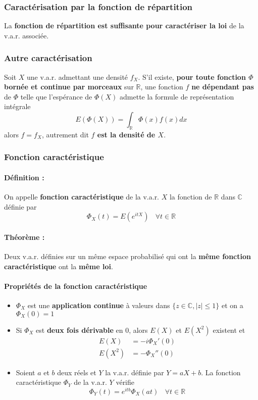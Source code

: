 \documentclass[10pt,a4paper,twoside]{article}
\begin{document}
\subsubsection{Caractérisation par la fonction de répartition}
La \textbf{fonction de répartition est suffisante pour caractériser la loi} de la v.a.r. associée.

\subsubsection{Autre caractérisation}
Soit $X$ une v.a.r. admettant une densité $f_{X}$. S'il existe, \textbf{pour toute fonction $\Phi$ bornée et continue par morceaux} sur $\mathbb{R}$, une fonction $f$ \textbf{ne dépendant pas} de $\Phi$ telle que l'espérance de $\Phi(X)$ admette la formule de représentation intégrale
$$E(\Phi(X))=\int_{\mathbb{R}} \Phi(x)f(x)dx$$
alors $f=f_{X}$, autrement dit \textbf{$f$ est la densité de $X$}.


\subsubsection{Fonction caractéristique}
\paragraph{Définition :} On appelle \textbf{fonction caractéristique} de la v.a.r. $X$ la fonction de $\mathbb{R}$ dans $\mathbb{C}$ définie par
$$\Phi_{X}(t)=E(e^{itX})\ \ \ \ \forall t \in \mathbb{R}$$

\paragraph{Théorème :} Deux v.a.r. définies sur un même espace probabilisé qui ont la \textbf{même fonction caractéristique} ont la \textbf{même loi}.

\paragraph{Propriétés de la fonction caractéristique}
\begin{itemize}
\item $\Phi_{X}$ est une \textbf{application continue} à valeurs dans $\{z\in \mathbb{C}, |z|\leqslant 1\}$ et on a $\Phi_{X}(0)=1$
\item Si $\Phi_{X}$ est \textbf{deux fois dérivable} en $0$, alors $E(X)$ et $E(X^{2})$ existent et
\begin{align*}
E(X) &= -i\Phi_{X}'(0)\\
E(X^{2}) &= -\Phi_{X}''(0)
\end{align*}
\item Soient $a$ et $b$ deux réels et $Y$ la v.a.r. définie par $Y=aX+b$. La fonction caractéristique $\Phi_{Y}$ de la v.a.r. $Y$ vérifie
$$\Phi_{Y}(t) = e^{itb}\Phi_{X}(at)\ \ \ \ \forall t \in \mathbb{R}$$
\end{itemize}
\end{document}
